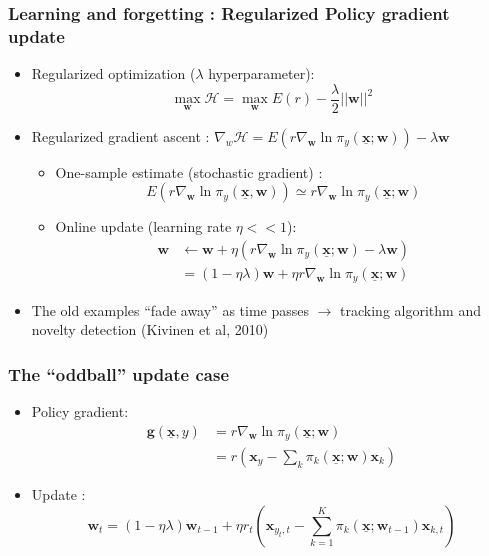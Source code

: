 \documentclass{beamer}
\begin{document}
\begin{frame}\frametitle{Learning and forgetting : Regularized Policy gradient update}
 \begin{itemize}
  \item Regularized optimization ($\lambda$ hyperparameter): 
  $$\max _{\boldsymbol{w}} \mathcal{H} = \max _{\boldsymbol{w}} E(r) - \frac{\lambda}{2}||\boldsymbol{w}||^2$$
  \item Regularized gradient ascent : 
  \footnotesize{$\nabla_w \mathcal{H} = {E}(r\nabla_\mathbf{w}\ln\pi_y(\underline{\mathbf{x}};\mathbf{w})) - \lambda \boldsymbol{w}$ }
  \begin{itemize}
    \item One-sample estimate (stochastic gradient) : 
    $$ E(  r \nabla_\mathbf{w}\ln\pi_y(\underline{\mathbf{x}},\mathbf{w}) ) 
       \simeq r \nabla_\mathbf{w}\ln\pi_y(\underline{\mathbf{x}};\mathbf{w}) $$
    \item Online update (learning rate $\eta << 1$):
    \begin{align}
      \boldsymbol{w} &\leftarrow \boldsymbol{w} + \eta ( r \nabla_\mathbf{w}\ln\pi_y(\underline{\mathbf{x}};\mathbf{w}) - \lambda \boldsymbol{w}) \nonumber \\
                     &= (1 - \eta \lambda) \boldsymbol{w} + \eta r \nabla_\mathbf{w}\ln\pi_y(\underline{\mathbf{x}};\mathbf{w}) \nonumber
    \end{align}
  \end{itemize}
  \item The old examples ``fade away'' as time passes
  $\rightarrow$ tracking algorithm and novelty detection (Kivinen et al, 2010)
  \end{itemize}

\end{frame}


\begin{frame}\frametitle{The ``oddball'' update case}
  \begin{itemize}
  \item Policy gradient:
  \begin{align}
    \boldsymbol{g}(\underline{\mathbf{x}},y) &= r \nabla_\mathbf{w}\ln\pi_y(\underline{\mathbf{x}};\mathbf{w}) \nonumber \\
                                             &= r \left(\boldsymbol{x}_y - \sum_k  \pi_k(\underline{\mathbf{x}};\boldsymbol{w}) \boldsymbol{x}_k \right)\nonumber
  \end{align}
  \item Update :
  $$
\boldsymbol{w}_t = (1-\eta\lambda) \boldsymbol{w}_{t-1} + \eta r_t \left( \boldsymbol{x}_{y_t,t} 
- \sum_{k=1}^K  \pi_k(\underline{\mathbf{x}};\boldsymbol{w}_{t-1}) \boldsymbol{x}_{k,t} \right) 
$$  
\end{itemize}
  
\end{frame}
\end{document}
